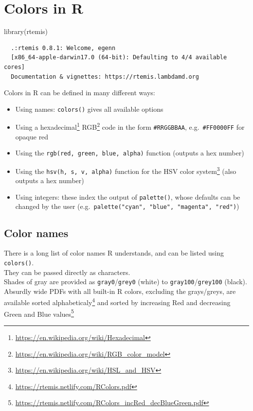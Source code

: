 \documentclass[
]{book}
\newenvironment{Shaded}{\begin{snugshade}}{\end{snugshade}}
\newcommand{\FunctionTok}[1]{\textcolor[rgb]{0.00,0.00,0.00}{#1}}
\newcommand{\NormalTok}[1]{#1}
\DeclareRobustCommand{\href}[2]{#2\footnote{\url{#1}}}
\providecommand{\tightlist}{%
  \setlength{\itemsep}{0pt}\setlength{\parskip}{0pt}}
\renewcommand{\href}[2]{#2\footnote{\url{#1}}}
\begin{document}
\hypertarget{colors}{%
\chapter{Colors in R}\label{colors}}

\begin{Shaded}
\begin{Highlighting}[]
\FunctionTok{library}\NormalTok{(rtemis)}
\end{Highlighting}
\end{Shaded}

\begin{verbatim}
  .:rtemis 0.8.1: Welcome, egenn
  [x86_64-apple-darwin17.0 (64-bit): Defaulting to 4/4 available cores]
  Documentation & vignettes: https://rtemis.lambdamd.org
\end{verbatim}

Colors in R can be defined in many different ways:

\begin{itemize}
\tightlist
\item
  Using names: \texttt{colors()} gives all available options
\item
  Using a \href{https://en.wikipedia.org/wiki/Hexadecimal}{hexadecimal} \href{https://en.wikipedia.org/wiki/RGB_color_model}{RGB} code in the form \texttt{\#RRGGBBAA}, e.g.~\texttt{\#FF0000FF} for opaque red
\item
  Using the \texttt{rgb(red,\ green,\ blue,\ alpha)} function (outputs a hex number)
\item
  Using the \texttt{hsv(h,\ s,\ v,\ alpha)} function for the \href{https://en.wikipedia.org/wiki/HSL_and_HSV}{HSV color system} (also outputs a hex number)
\item
  Using integers: these index the output of \texttt{palette()}, whose defaults can be changed by the user (e.g.~\texttt{palette("cyan",\ "blue",\ "magenta",\ "red")})
\end{itemize}

\hypertarget{color-names}{%
\section{Color names}\label{color-names}}

There is a long list of color names R understands, and can be listed using \texttt{colors()}.\\
They can be passed directly as characters.\\
Shades of gray are provided as \texttt{gray0}/\texttt{grey0} (white) to \texttt{gray100}/\texttt{grey100} (black).\\
Absurdly wide PDFs with all built-in R colors, excluding the grays/greys, are available sorted \href{https://rtemis.netlify.com/RColors.pdf}{alphabeticaly} and sorted by \href{https://rtemis.netlify.com/RColors_incRed_decBlueGreen.pdf}{increasing Red and decreasing Green and Blue values}
\end{document}
